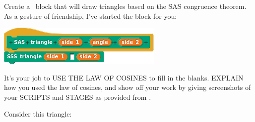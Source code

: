 \documentclass[noauthor,nooutcomes,12pt,handout]{ximera}
\begin{document}
\begin{question}
  Create a \snap\ block that will draw triangles based on the SAS
  congruence theorem.  As a gesture of friendship, I've started the
  block for you:
  \begin{center}
    \includegraphics{sasBlockBLANK}
  \end{center}
  It's your job to USE THE LAW OF COSINES to fill in the
  blanks. EXPLAIN how you used the law of cosines, and show off your
  work by giving screenshots of your SCRIPTS and STAGES as provided
  from \snap.
  \begin{freeResponse}
    Consider this triangle:
    \begin{center}
\end{center}
\end{freeResponse}
\end{question}
\end{document}
